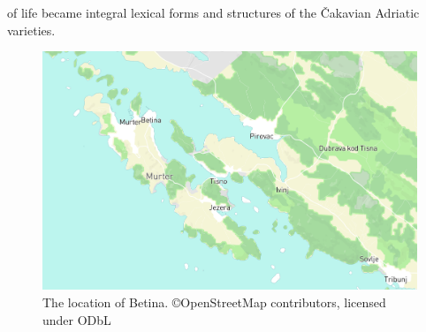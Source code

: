 \documentclass[output=paper]{LSP/langsci}
\begin{document}
of life became integral lexical forms and structures of the Čakavian  Adriatic varieties.

\begin{figure}[t]
\includegraphics[width=\textwidth]{illustrations/skevin_betinalocation3.png}
\caption{The location of Betina.  {\tiny ©OpenStreetMap contributors, licensed under ODbL}}
\label{fig:skevin:skevin:betinalocation} 
\end{figure}
\end{document}
